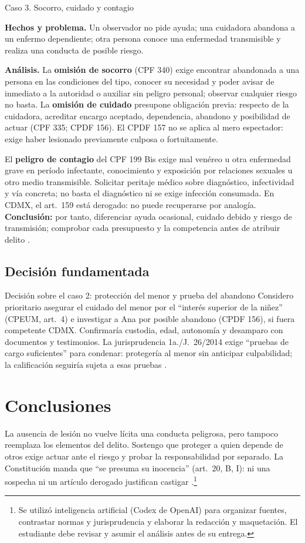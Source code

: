 \documentclass[spanish,letterpaper,oneside]{article}
\newcommand{\fichacaso}[1]{%
  \begin{tcolorbox}[colback=white,colframe=casoverde!25,
    boxrule=0.4pt,arc=0.6mm,left=1.6mm,right=1.6mm,top=1mm,bottom=1mm,
    before skip=0pt,after skip=3pt]
    #1
  \end{tcolorbox}%
}
\begin{document}
\begin{casoestudio}{Caso 3. Socorro, cuidado y contagio}
\fichacaso{\textbf{Hechos y problema.} Un observador no pide ayuda; una cuidadora abandona a un enfermo dependiente; otra persona conoce una enfermedad transmisible y realiza una conducta de posible riesgo.}
\textbf{Análisis.} La \textbf{omisión de socorro} (CPF 340) exige encontrar abandonada a una persona en las condiciones del tipo, conocer su necesidad y poder avisar de inmediato a la autoridad o auxiliar sin peligro personal; observar cualquier riesgo no basta. La \textbf{omisión de cuidado} presupone obligación previa: respecto de la cuidadora, acreditar encargo aceptado, dependencia, abandono y posibilidad de actuar (CPF 335; CPDF 156). El CPDF 157 no se aplica al mero espectador: exige haber lesionado previamente culposa o fortuitamente.

El \textbf{peligro de contagio} del CPF 199 Bis exige mal venéreo u otra enfermedad grave en período infectante, conocimiento y exposición por relaciones sexuales u otro medio transmisible. Solicitar peritaje médico sobre diagnóstico, infectividad y vía concreta; no basta el diagnóstico ni se exige infección consumada. En CDMX, el art.~159 está derogado: no puede recuperarse por analogía. \textbf{Conclusión:} por tanto, diferenciar ayuda ocasional, cuidado debido y riesgo de transmisión; comprobar cada presupuesto y la competencia antes de atribuir delito \citep{cpfS4Vigente,cpdfS4Vigente}.
\end{casoestudio}

\subsection*{Decisión fundamentada}
\begin{casoestudio}{Decisión sobre el caso 2: protección del menor y prueba del abandono}
Considero prioritario asegurar el cuidado del menor por el ``interés superior de la niñez'' (CPEUM, art.~4) e investigar a Ana por posible abandono (CPDF 156), si fuera competente CDMX. Confirmaría custodia, edad, autonomía y desamparo con documentos y testimonios. La jurisprudencia 1a./J.~26/2014 exige ``pruebas de cargo suficientes'' para condenar: protegería al menor sin anticipar culpabilidad; la calificación seguiría sujeta a esas pruebas \citep{cpeumS4Vigente,cpdfS4Vigente,scjnPresuncionS4}.
\end{casoestudio}

\clearpage
\section{Conclusiones}
La ausencia de lesión no vuelve lícita una conducta peligrosa, pero tampoco reemplaza los elementos del delito. Sostengo que proteger a quien depende de otros exige actuar ante el riesgo y probar la responsabilidad por separado. La Constitución manda que ``se presuma su inocencia'' (art.~20, B, I): ni una sospecha ni un artículo derogado justifican castigar \citep{cpeumS4Vigente}.\footnote{Se utilizó inteligencia artificial (Codex de OpenAI) para organizar fuentes, contrastar normas y jurisprudencia y elaborar la redacción y maquetación. El estudiante debe revisar y asumir el análisis antes de su entrega.}
\end{document}
